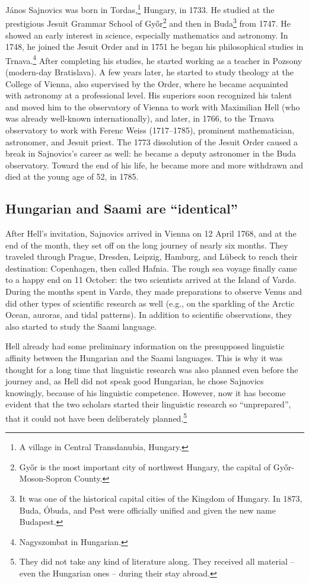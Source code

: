 \documentclass[output=paper,colorlinks,citecolor=brown,arabicfont,chinesefont]{langscibook}
\begin{document}
János Sajnovics was born in Tordas,\footnote{A village in Central Transdanubia, Hungary.} Hungary, in 1733. He studied at the prestigious Jesuit Grammar School of Győr\footnote{Győr is the most important city of northwest Hungary, the capital of Győr-Moson-Sopron County.} and then in Buda\footnote{It was one of the historical capital cities of the Kingdom of Hungary. In 1873, Buda, Óbuda, and Pest were officially unified and given the new name Budapest.} from 1747. He showed an early interest in science, especially mathematics and astronomy. In 1748, he joined the Jesuit Order and in 1751 he began his philosophical studies in Trnava.\footnote{Nagyszombat in Hungarian.} After completing his studies, he started working as a teacher in Pozsony (modern-day Bratislava). A few years later, he started to study theology at the College of Vienna, also supervised by the Order, where he became acquainted with astronomy at a professional level.  His superiors soon recognized his talent and moved him to the observatory of Vienna to work with Maximilian Hell (who was already well-known internationally), and later, in 1766, to the Trnava observatory to work with Ferenc Weiss (1717–1785), prominent mathematician, astronomer, and Jesuit priest. The 1773 dissolution of the Jesuit Order caused a break in Sajnovics’s career as well: he became a deputy astronomer in the Buda observatory. Toward the end of his life, he became more and more withdrawn and died at the young age of 52, in 1785.

\subsection{Hungarian and Saami are “identical”}

After Hell’s invitation, Sajnovics arrived in Vienna on 12 April 1768,  and at the end of the month, they set off on the long journey of nearly six months. They traveled through Prague, Dresden, Leipzig, Hamburg, and Lübeck to reach their destination: Copenhagen, then called Hafnia. The rough sea voyage finally came to a happy end on 11 October: the two scientists arrived at the Island of Vardø. During the months spent in Vardø, they made preparations to observe Venus and did other types of scientific research as well (e.g., on the sparkling of the Arctic Ocean, auroras, and tidal patterns). In addition to scientific observations, they also started to study the Saami language.

Hell already had some preliminary information on the presupposed linguistic affinity between the Hungarian and the Saami languages. This is why it was thought for a long time that linguistic research was also planned even before the journey and, as Hell did not speak good Hungarian, he chose Sajnovics knowingly, because of his linguistic competence. However, now it has become evident that the two scholars started their linguistic research so “unprepared”, that it could not have been deliberately planned.\footnote{They did not take any kind of literature along. They received all material – even the Hungarian ones – during their stay abroad.}
\end{document}
